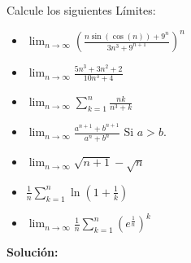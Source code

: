 \documentclass[12pt]{book}
\begin{document}
\begin{prob}{}{}
Calcule los siguientes Límites:
    \begin{itemize}
        \item[\textbf{a)}] $ \displaystyle \lim_{n \to \infty} \left(\frac{n \sin(\cos(n))+9^n}{3n^3+9^{n+1}} \right)^n$
        \item[\textbf{b)}] $\displaystyle \lim_{n \to \infty} \frac{5n^3+3n^2+2}{10n^3+4}$
        \item[\textbf{c)}] $\displaystyle \lim_{n \to \infty} \sum_{k=1}^n \frac{nk}{n^3+k}$
        \item[\textbf{d)}] $\displaystyle \lim_{n \to \infty} \frac{a^{n+1}+b^{n+1}}{a^n+b^n}$ \quad Si $a>b$.
        \item[\textbf{e)}] $\displaystyle \lim_{n \to \infty}  \sqrt{n+1}-\sqrt{n} $
        \item[\textbf{f)}] $\displaystyle \frac{1}{n} \sum_{k=1}^n \ln\left( 1+ \frac{1}{k}\right)$
        \item[\textbf{g)}] $\displaystyle \lim_{n \to \infty} \frac{1}{n} \sum_{k=1}^n \left(e^{\frac{1}{n}}\right)^k$
        
    \end{itemize}
\end{prob}
\textbf{Solución:}
\end{document}
